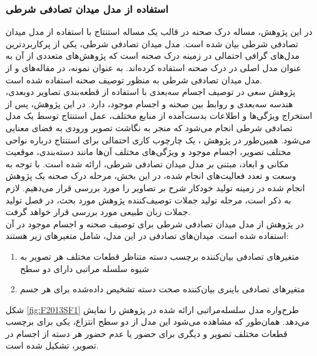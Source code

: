 \subsubsection[استفاده از مدل میدان تصادفی شرطی]{استفاده از مدل میدان تصادفی شرطی}
در این پژوهش، مساله درک صحنه در قالب یک مساله استنتاج با استفاده از مدل میدان تصادفی شرطی بیان شده است. مدل میدان تصادفی شرطی، یکی از پرکاربردترین مدل‌های گرافی احتمالی در زمینه درک صحنه است که پژوهش‌های متعددی از آن به عنوان مدل اصلی در درک صحنه استفاده کرده‌اند. به عنوان نمونه، در مقاله‌های 
\cite{Lin_2013_ICCV}
و
\cite{ladicky2010and}
از مدل میدان تصادفی شرطی به منظور توصیف صحنه استفاده شده است.\\

 پژوهش \cite{Lin_2013_ICCV} سعی در توصیف اجسام سه‌بعدی با استفاده از قطعه‌بندی تصاویر دوبعدی، هندسه سه‌بعدی و روابط بین صحنه و اجسام موجود، دارد. در این پژوهش، پس از استخراج ویژگی‌ها و اطلاعات بدست‌آمده از منابع مختلف، عمل استنتاج توسط یک مدل تصادفی شرطی انجام می‌شود که منجر به نگاشت تصویر ورودی به فضای معنایی می‌شود. همین‌طور در پژوهش \cite{ladicky2010and}، یک چارچوب کاری احتمالی برای استنتاج درباره نواحی مختلف تصویر، اجسام موجود و ویژگی‌های مختلف آن‌ها مانند دسته‌بندی، موقعیت مکانی و ابعاد، مبتنی بر مدل میدان تصادفی شرطی، ارائه شده است. با توجه به وسعت و تعدد فعالیت‌های انجام شده، در این بخش، مرحله درک صحنه یک پژوهش انجام شده در زمینه تولید خودکار شرح بر تصاویر را مورد بررسی قرار می‌دهیم. لازم به ذکر است، مرحله تولید جملات توصیف‌کننده پژوهش مورد بحث، در فصل تولید جملات زبان طبیعی مورد بررسی قرار خواهد گرفت.
\\
در پژوهش\cite{fidler2013sentence}
از مدل میدان تصادفی شرطی برای توصیف صحنه و اجسام موجود در آن استفاده شده است. میدان‌های تصادفی در این مدل، شامل متغیرهای زیر هستند:
\begin{enumerate}
\item  متغیرهای تصادفی بیان‌کننده برچسب دسته متناظر قطعات مختلف هر تصویر به شیوه سلسله مراتبی دارای دو سطح
\item متغیرهای تصادفی باینری بیان‌کننده صحت دسته‌ تشخیص داده‌شده برای هر جسم
\end{enumerate}

شکل
\ref{fig:F2013SF1}
 طرح‌واره مدل سلسله‌مراتبی ارائه شده در پژوهش \cite{fidler2013sentence} را نمایش می‌دهد. همان‌طور که مشاهده می‌شود این مدل از دو سطح انتزاع، یکی برای برچسب قطعات مختلف تصویر و دیگری برای حضور یا عدم حضور هر دسته از اجسام در تصویر، تشکیل شده است.

